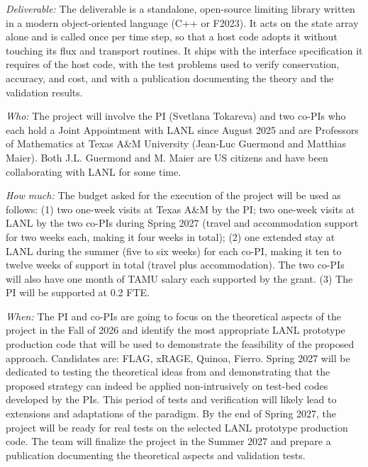 \documentclass[12pt,twoside]{paper}
\begin{document}
\vspace*{0.5\baselineskip}

\textit{Deliverable:} The deliverable is a standalone, open-source limiting
library written in a modern object-oriented language (C++ or F2023). It
acts on the state array alone and is called once per time step, so that a
host code adopts it without touching its flux and transport routines. It
ships with the interface specification it requires of the host code, with
the test problems used to verify conservation, accuracy, and cost, and with
a publication documenting the theory and the validation results.


\vspace*{0.5\baselineskip}

\textit{Who:} The project will involve the PI (Svetlana Tokareva) and two co-PIs
who each hold a Joint Appointment with LANL since August 2025 and are
Professors of Mathematics at Texas A\&M University (Jean-Luc Guermond and
Matthias Maier). Both J.L. Guermond and M. Maier are US citizens and have been
collaborating with LANL for some time.

\vspace*{0.5\baselineskip}

\textit{How much:} The budget asked for the execution of the project will
be used as follows: (1) two one-week visits at Texas A\&M by the PI; two
one-week visits at LANL by the two co-PIs during Spring 2027 (travel and
accommodation support for two weeks each, making it four weeks in total); (2) one
extended stay at LANL during the summer (five to six weeks) for each co-PI,
making it ten to twelve weeks of support in total (travel plus accommodation).
The two co-PIs will also have one month of TAMU salary each supported by the grant.
(3) The PI will be supported at 0.2 FTE.

\vspace*{0.5\baselineskip}

\textit{When:} The PI and co-PIs are going to focus on the theoretical
aspects of the project in the Fall of 2026 and identify the most
appropriate LANL prototype production code that will be used to demonstrate
the feasibility of the proposed approach. Candidates are: FLAG, xRAGE,
Quinoa, Fierro. Spring 2027 will be dedicated to testing the theoretical
ideas from \cite{Guermond_arxiv_2026} and demonstrating that the proposed
strategy can indeed be applied non-intrusively on test-bed codes developed
by the PIs. This period of tests and verification will likely lead to
extensions and adaptations of the paradigm. By the end of Spring 2027, the
project will be ready for real tests on the selected LANL prototype
production code. The team will finalize the project in the Summer 2027 and
prepare a publication documenting the theoretical aspects and validation
tests.
\end{document}
